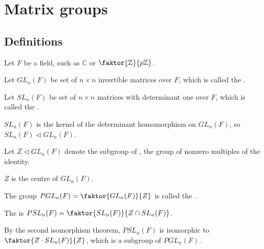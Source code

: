\section{Matrix groups}

\subsection{Definitions}
Let $F$ be a field, such as $\mathbb C$ or $\faktor{\mathbb Z}{p \mathbb Z}$.

\begin{definition}
	Let $GL_n(F)$ be set of $n \times n$ invertible matrices over $F$, which is called the .
\end{definition} 

\begin{definition}
	Let $SL_n(F)$ be set of $n \times n$ matrices with determinant one over $F$, which is called the .
\end{definition} 

\begin{remark}
	$SL_n(F)$ is the kernel of the determinant homomorphism on $GL_n(F)$, so $SL_n(F) \triangleleft GL_n(F)$.
\end{remark} 	

\begin{definition}
	Let $Z \triangleleft GL_n(F)$ denote the subgroup of , the group of nonzero multiples of the identity.
\end{definition} 

\begin{remark}
	$Z$ is the centre of $GL_n(F)$.
\end{remark} 

\begin{definition}
	The group $PGL_n(F) = \faktor{GL_n(F)}{Z}$ is called the . 
\end{definition} 

\begin{definition}
	The  is $PSL_n(F) = \faktor{SL_n(F)}{Z \cap SL_n(F)}$.
\end{definition} 

\begin{remark}
	By the second isomorphism theorem, $PSL_n(F)$ is isomorphic to $\faktor{Z \cdot SL_n(F)}{Z}$, which is a subgroup of $PGL_n(F)$.
\end{remark} 

